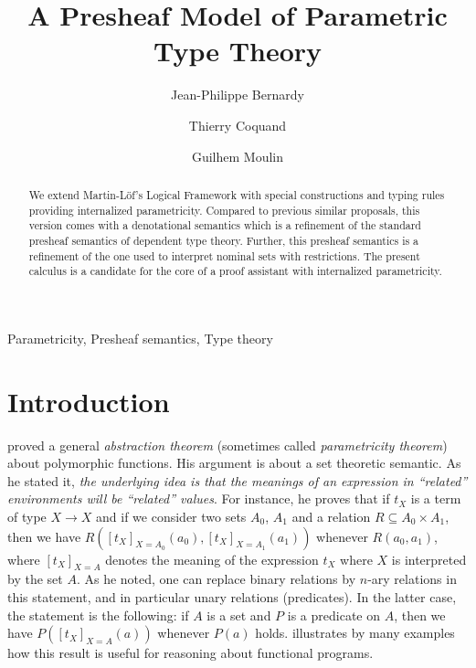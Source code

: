 \documentclass[english]{PaperTools/latex/entcs}
\theoremstyle{plain}
\theoremstyle{definition}
\theoremstyle{remark}
\begin{document}
\begin{frontmatter}
  \title{A Presheaf Model of Parametric Type Theory}
  \author{Jean-Philippe Bernardy}
  \author{Thierry Coquand}
  \author{Guilhem Moulin}
  \address{Chalmers University of Technology and University of Gothenburg \\
  \href{mailto:bernardy@chalmers.se,coquand@chalmers.se,mouling@chalmers.se}%
       {\textnormal\tt\{bernardy,coquand,mouling\}@chalmers.se}}
\begin{abstract}
  We extend Martin-Löf's Logical Framework with special constructions
  and typing rules providing internalized parametricity.
  Compared to previous similar proposals, this version
  comes with a denotational semantics which is a refinement of the
  standard presheaf semantics of dependent type theory. Further, this
  presheaf semantics is a refinement of the one used to interpret
  nominal sets with restrictions.  The present calculus is a candidate for the
  core of a proof assistant with internalized parametricity.
\end{abstract}
\begin{keyword}
  Parametricity, Presheaf semantics, Type theory
\end{keyword}
\end{frontmatter}

\section{Introduction}
\citet{reynolds_types_1983} proved a general \emph{abstraction theorem} (sometimes called
\emph{parametricity theorem}) about polymorphic functions. His argument is
about a set theoretic semantic.  As he stated it, {\em the underlying
  idea is that the meanings of an expression in ``related''
  environments will be ``related'' values}.  For instance, he proves
that if $t_X$ is a term of type $X → X$ and if we consider two sets
$A_0$, $A_1$ and a relation $R ⊆ A_0 × A_1$, then we have
$R([t_X]_{X=A_0}(a_0),[t_X]_{X=A_1}(a_1))$ whenever $R(a_0,a_1)$,
where $[t_X]_{X=A}$ denotes the meaning of the expression $t_X$ where
$X$ is interpreted by the set $A$. As he noted, one can replace binary
relations by $n$-ary relations in this statement, and in particular
unary relations (predicates). In the latter case, the statement is the following:
if $A$ is a set and $P$ is a predicate on $A$, then we have
$P([t_X]_{X=A}(a))$ whenever $P(a)$ holds.
\citet{wadler_theorems_1989} illustrates by many examples how this
result is useful for reasoning about functional programs.
\end{document}
